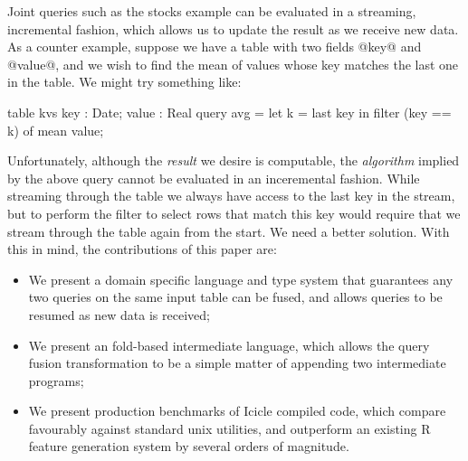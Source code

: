 Joint queries such as the stocks example can be evaluated in a streaming, incremental fashion, which allows us to update the result as we receive new data. As a counter example, suppose we have a table with two fields @key@ and @value@, and we wish to find the mean of values whose key matches the last one in the table. We might try something like:
\begin{code}
  table kvs { key : Date; value : Real }
  query avg = let k = last key
              in  filter (key == k) of mean value;
\end{code}
Unfortunately, although the \emph{result} we desire is computable, the \emph{algorithm} implied by the above query cannot be evaluated in an inceremental fashion. While streaming through the table we always have access to the last key in the stream, but to perform the filter to select rows that match this key would require that we stream through the table again from the start. We need a better solution. With this in mind, the contributions of this paper are:
\begin{itemize}
\item
We present a domain specific language and type system that guarantees any two queries on the same input table can be fused, and allows queries to be resumed as new data is received;

\item
We present an fold-based intermediate language, which allows the query fusion transformation to be a simple matter of appending two intermediate programs;

\item
We present production benchmarks of Icicle compiled code, which compare favourably against standard unix utilities, and outperform an existing R feature generation system by several orders of magnitude.
\end{itemize}




